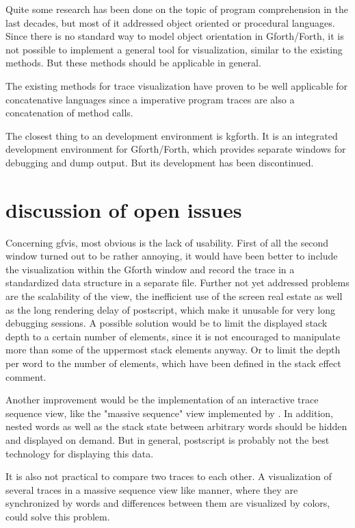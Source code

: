 Quite some research has been done on the topic of program comprehension in the last decades, but most of it addressed object oriented or procedural languages. Since there is no standard way to model object orientation in Gforth/Forth, it is not possible to implement a general tool for visualization, similar to the existing methods. But these methods should be applicable in general.

The existing methods for trace visualization have proven to be well applicable for concatenative languages since a imperative program traces are also a concatenation of method calls.

The closest thing to an development environment is kgforth. It is an integrated development environment for Gforth/Forth, which provides separate windows for debugging and dump output. But its development has been discontinued.

\section{discussion of open issues}

Concerning gfvis, most obvious is the lack of usability. First of all the second window turned out to be rather annoying, it would have been better to include the visualization within the Gforth window and record the trace in a standardized data structure in a separate file.
Further not yet addressed problems are the scalability of the view, the inefficient use of the screen real estate as well as the long rendering delay of postscript, which make it unusable for very long debugging sessions. A possible solution would be to limit the displayed stack depth to a certain number of elements, since it is not encouraged to manipulate more than some of the uppermost stack elements anyway. Or to limit the depth per word to the number of elements, which have been defined in the stack effect comment.

Another improvement would be the implementation of an interactive trace sequence view, like the "massive sequence" view implemented by \cite{Cornelissen:2008:ETA:1454787.1454981}. In addition, nested words as well as the stack state between arbitrary words should be hidden and displayed on demand. But in general, postscript is probably not the best technology for displaying this data.

It is also not practical to compare two traces to each other. A visualization of several traces in a massive sequence view like manner, where they are synchronized by words and differences between them are visualized by colors, could solve this problem.

